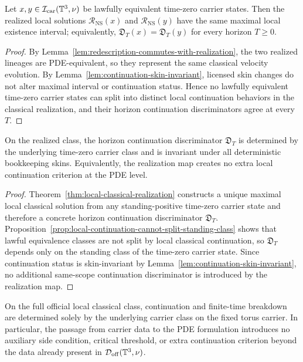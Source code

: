 \begin{proposition}\label{prop:local-continuation-cannot-split-standing-class}
Let $x,y\in\mathcal I_{\mathrm{car}}(\mathbb{T}^3,\nu)$ be lawfully equivalent time-zero carrier states. Then the
realized local solutions $\mathcal R_{\mathrm{NS}}(x)$ and $\mathcal R_{\mathrm{NS}}(y)$ have the same maximal
local existence interval; equivalently, $\mathfrak D_T(x)=\mathfrak D_T(y)$ for every horizon $T\ge0$.
\end{proposition}

\begin{proof}
By Lemma~\ref{lem:redescription-commutes-with-realization}, the two realized lineages are
PDE-equivalent, so they represent the same classical velocity evolution. By
Lemma~\ref{lem:continuation-skin-invariant}, licensed skin changes do not alter maximal interval or
continuation status. Hence no lawfully equivalent time-zero carrier states can split into distinct
local continuation behaviors in the classical realization, and their horizon continuation
discriminators agree at every $T$.
\end{proof}

\begin{theorem}\label{thm:initial-local-faithfulness}
On the realized class, the horizon continuation discriminator $\mathfrak D_T$ is determined by the
underlying time-zero carrier class and is invariant under all deterministic bookkeeping skins.
Equivalently, the realization map creates no extra local continuation criterion at the PDE level.
\end{theorem}

\begin{proof}
Theorem~\ref{thm:local-classical-realization} constructs a unique maximal local classical solution from
any standing-positive time-zero carrier state and therefore a concrete horizon continuation
discriminator $\mathfrak D_T$. Proposition~\ref{prop:local-continuation-cannot-split-standing-class}
shows that lawful equivalence classes are not split by local classical continuation, so $\mathfrak D_T$
depends only on the standing class of the time-zero carrier state. Since continuation status is
skin-invariant by Lemma~\ref{lem:continuation-skin-invariant}, no additional same-scope
continuation discriminator is introduced by the realization map.
\end{proof}

\begin{corollary}\label{cor:no-hidden-continuation-criterion}
On the full official local classical class, continuation and finite-time breakdown are determined
solely by the underlying carrier class on the fixed torus carrier. In particular, the passage from
carrier data to the PDE formulation introduces no auxiliary side condition, critical threshold, or
extra continuation criterion beyond the data already present in
$\mathcal D_{\mathrm{off}}(\mathbb{T}^3,\nu)$.
\end{corollary}

